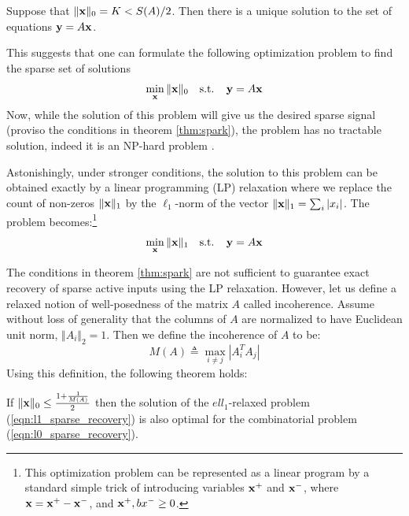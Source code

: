 \begin{theorem}
\label{thm:spark}
Suppose that $\Vert \mathbf{x} \Vert_0 = K < S(A) / 2$. Then there is a unique solution to the 
set of equations $\mathbf{y} = A \mathbf{x}$. 
\end{theorem}

This suggests that one can formulate the following optimization problem to find the sparse set of solutions
\begin{equation}
\label{eqn:l0_sparse_recovery}
\min_{\mathbf{x}} \Vert \mathbf{x} \Vert_0  ~~\mbox{ s.t. }~~ \mathbf{y} = A \mathbf{x}
\end{equation}
Now, while the solution of this problem will give us the desired sparse signal (proviso the conditions in 
theorem \ref{thm:spark}), the problem has no tractable solution, indeed it is an NP-hard problem \cite{complexity_sparse_rec}. 

Astonishingly, under stronger conditions, the solution to this problem can be obtained exactly by a linear
programming (LP) relaxation where we replace the count of non-zeros $\Vert \mathbf{x} \Vert_1$  by the $\ell_1$-norm
of the vector $\Vert \mathbf{x} \Vert_1 = \sum_i | x_i|$. The problem becomes:\footnote{This optimization problem can be represented as a linear
program by a standard simple trick of introducing variables $\mathbf{x}^+$ and $\mathbf{x}^-$, where $\mathbf{x} = \mathbf{x}^+ - \mathbf{x}^-$, 
and $\mathbf{x}^+, bx^- \ge 0$. }
\begin{equation}
\label{eqn:l1_sparse_recovery}
\min_{\mathbf{x}} \Vert \mathbf{x} \Vert_1  ~~\mbox{ s.t. }~~ \mathbf{y} = A \mathbf{x}
\end{equation}

The conditions in theorem \ref{thm:spark} are not sufficient to guarantee exact recovery of
sparse active inputs using the LP relaxation. However, let us define a relaxed notion of 
well-posedness of the matrix $A$ called incoherence. Assume without loss of generality that
the columns of $A$ are normalized to have Euclidean unit norm, $\Vert A_i \Vert_2 = 1$. Then 
we define the incoherence of $A$ to be:
\begin{equation}
M(A) \triangleq \max_{i \ne j} | A_i^T A_j |
\end{equation}
Using this definition, the following theorem holds:

\begin{theorem}
\label{thm:incoherence}
If $\Vert \mathbf{x} \Vert_0 \le \frac{ 1 + \frac{1}{M(A)}} {2}$ then the solution of the $ell_1$-relaxed 
problem (\ref{eqn:l1_sparse_recovery}) is also optimal for the combinatorial problem
(\ref{eqn:l0_sparse_recovery}). 
\end{theorem}

